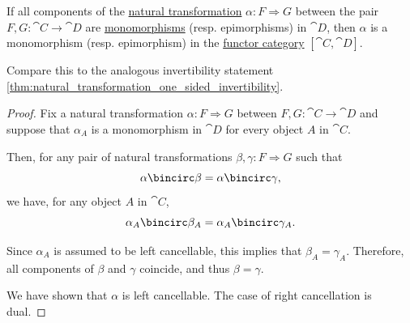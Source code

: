 \begin{proposition}\label{thm:natural_transformation_cancellation}
  If all components of the \hyperref[def:natural_transformation]{natural transformation} \( \alpha: F \Rightarrow G \) between the pair \( F, G: \cat{C} \to \cat{D} \) are \hyperref[def:morphism_cancellation/left]{monomorphisms} (resp. epimorphisms) in \( \cat{D} \), then \( \alpha \) is a monomorphism (resp. epimorphism) in the \hyperref[def:functor_category]{functor category} \( [\cat{C}, \cat{D}] \).
\end{proposition}
\begin{comments}
  \item Compare this to the analogous invertibility statement \cref{thm:natural_transformation_one_sided_invertibility}.
\end{comments}
\begin{proof}
  Fix a natural transformation \( \alpha: F \Rightarrow G \) between \( F, G: \cat{C} \to \cat{D} \) and suppose that \( \alpha_A \) is a monomorphism in \( \cat{D} \) for every object \( A \) in \( \cat{C} \).

  Then, for any pair of natural transformations \( \beta, \gamma: F \Rightarrow G \) such that
  \begin{equation*}
    \alpha \bincirc \beta = \alpha \bincirc \gamma,
  \end{equation*}
  we have, for any object \( A \) in \( \cat{C} \),
  \begin{equation*}
    \alpha_A \bincirc \beta_A = \alpha_A \bincirc \gamma_A.
  \end{equation*}

  Since \( \alpha_A \) is assumed to be left cancellable, this implies that \( \beta_A = \gamma_A \). Therefore, all components of \( \beta \) and \( \gamma \) coincide, and thus \( \beta = \gamma \).

  We have shown that \( \alpha \) is left cancellable. The case of right cancellation is dual.
\end{proof}

